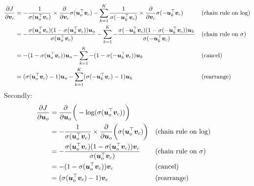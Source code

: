 \begin{enumerate}
        \begin{answer}
            \begin{equation*}
                \begin{aligned}
                    {\partial J \over \partial \bm v_c} &= -\frac{1}{\sigma(\bm u_o^\top \bm v_c)} \times {\partial \over \partial \bm v_c} \sigma(\bm u_o^\top \bm v_c) - \sum_{k=1}^K \frac{1}{\sigma(- \bm u_k^\top \bm v_c)} \times {\partial \over \partial \bm v_c} \sigma(- \bm u_k^\top \bm v_c) && \text{(chain rule on $\log$)}\\
                    &= -\frac{\sigma(\bm u_o^\top \bm v_c) (1 - \sigma(\bm u_o^\top \bm v_c))\bm u_o}{\sigma(\bm u_o^\top \bm v_c)} - \sum_{k=1}^K -\frac{\sigma(-\bm u_k^\top \bm v_c) (1 - \sigma(-\bm u_k^\top \bm v_c))\bm u_k}{\sigma(-\bm u_k^\top \bm v_c)} && \text{(chain rule on $\sigma$)}\\
                    &= -(1 - \sigma(\bm u_{o}^\top \bm v_c))\bm u_o - \sum_{k=1}^K -(1 - \sigma(-\bm u_{k}^\top \bm v_c) )\bm u_{k} && \text{(cancel)}\\
                    &= (\sigma(\bm u_{o}^\top \bm v_c) - 1)\bm u_o - \sum_{k=1}^K (\sigma(-\bm u_{k}^\top \bm v_c) - 1)\bm u_{k} && \text{(rearrange)}
                \end{aligned}
                \end{equation*}
                Secondly:
                \begin{equation*}
                \begin{aligned}
                    {\partial J \over \partial \bm u_{o}} &= {\partial \over \partial \bm u_o} \bigg( -\log(\sigma(\bm u_o^\top \bm v_c)) \bigg) \\
                    &= - \frac{1}{\sigma(\bm u_o^\top \bm v_c)} \times {\partial \over \partial \bm u_o} \bigg( \sigma(\bm u_o^\top \bm v_c) \bigg) && \text{(chain rule on $\log$)} \\
                    &=  -\frac{\sigma(\bm u_o^\top \bm v_c) (1 - \sigma(\bm u_o^\top \bm v_c))\bm v_c}{\sigma(\bm u_o^\top \bm v_c)} && \text{(chain rule on $\sigma$)} \\
                    &= -(1 - \sigma(\bm u_o^\top \bm v_c))\bm v_c && \text{(cancel)} \\
                    &= (\sigma(\bm u_{o}^\top \bm v_c) - 1) \bm v_c && \text{(rearrange)} \\
                \end{aligned}
                \end{equation*}

\end{answer}
\end{enumerate}
